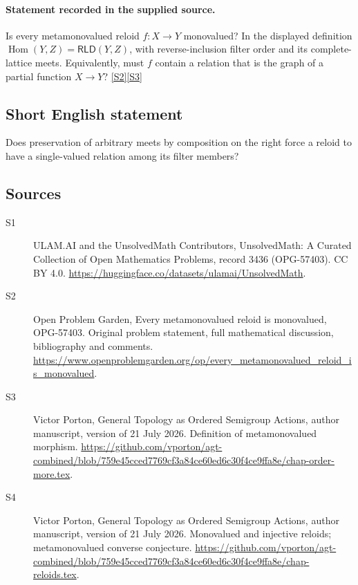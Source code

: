 \documentclass[11pt]{article}
\newcommand{\sref}[2]{\hyperlink{source:#1:#2}{[S#2]}}
\begin{document}
\paragraph{Statement recorded in the supplied source.}
Is every metamonovalued reloid $f:X\to Y$ monovalued? In the displayed definition $\operatorname{Hom}(Y,Z)=\mathsf{RLD}(Y,Z)$, with reverse-inclusion filter order and its complete-lattice meets. Equivalently, must $f$ contain a relation that is the graph of a partial function $X\to Y$? \sref{3436}{2}\sref{3436}{3}
\subsection{Short English statement}
Does preservation of arbitrary meets by composition on the right force a reloid to have a single-valued relation among its filter members?
\subsection{Sources}
\begin{description}
\item[\hypertarget{source:3436:1}{S1}] ULAM.AI and the UnsolvedMath Contributors, UnsolvedMath: A Curated Collection of Open Mathematics Problems, record 3436 (OPG-57403). CC BY 4.0. \url{https://huggingface.co/datasets/ulamai/UnsolvedMath}.
\item[\hypertarget{source:3436:2}{S2}] Open Problem Garden, Every metamonovalued reloid is monovalued, OPG-57403. Original problem statement, full mathematical discussion, bibliography and comments. \url{https://www.openproblemgarden.org/op/every_metamonovalued_reloid_is_monovalued}.
\item[\hypertarget{source:3436:3}{S3}] Victor Porton, General Topology as Ordered Semigroup Actions, author manuscript, version of 21 July 2026. Definition of metamonovalued morphism. \url{https://github.com/vporton/agt-combined/blob/759e45cced7769cf3a84ce60ed6c30f4ce9ffa8e/chap-order-more.tex}.
\item[\hypertarget{source:3436:4}{S4}] Victor Porton, General Topology as Ordered Semigroup Actions, author manuscript, version of 21 July 2026. Monovalued and injective reloids; metamonovalued converse conjecture. \url{https://github.com/vporton/agt-combined/blob/759e45cced7769cf3a84ce60ed6c30f4ce9ffa8e/chap-reloids.tex}.
\end{description}
\label{end:3436}
\end{document}
